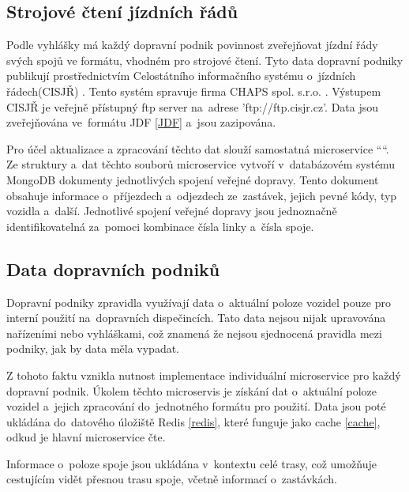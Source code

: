 \subsection [Jízdní řády]{Strojové čtení jízdních řádů} \label{strojoveCteniJR}
Podle vyhlášky \cite{vyhlaskaJizdniRady} má každý dopravní podnik povinnost zveřejňovat jízdní řády svých spojů ve formátu, vhodném pro strojové čtení. Tyto data dopravní podniky publikují prostřednictvím Celostátního informačního systému o~jízdních řádech(CISJŘ) \cite{cisjr}. Tento systém spravuje firma CHAPS spol. s.r.o. \cite{chaps}. Výstupem CISJŘ je veřejně přístupný ftp server na~adrese 'ftp://ftp.cisjr.cz'. Data jsou zveřejňována ve~formátu JDF \ref{JDF} a~jsou zazipována. \par
Pro účel aktualizace a zpracování těchto dat slouží samostatná microservice ““.
Ze struktury a~dat těchto souborů microservice vytvoří v~databázovém systému MongoDB dokumenty jednotlivých spojení veřejné dopravy. Tento dokument obsahuje informace o~příjezdech a~odjezdech ze~zastávek, jejich pevné kódy, typ vozidla a~další. Jednotlivé spojení veřejné dopravy jsou jednoznačně identifikovatelná za~pomoci kombinace čísla linky a~čísla spoje.
\subsection {Data dopravních podniků}
Dopravní podniky zpravidla využívají data o~aktuální poloze vozidel pouze pro interní použití na~dopravních dispečincích. Tato data nejsou nijak upravována nařízeními nebo vyhláškami, což znamená že nejsou sjednocená pravidla mezi podniky, jak by data měla vypadat.\par
Z tohoto faktu vznikla nutnost implementace individuální microservice pro každý dopravní podnik. Úkolem těchto microservis je získání dat o~aktuální poloze vozidel a~jejich zpracování do~jednotného formátu pro použití. Data jsou poté ukládána do~datového úložiště Redis \ref{redis}, které funguje jako cache \ref{cache}, odkud je hlavní microservice čte.\par
Informace o~poloze spoje jsou ukládána v~kontextu celé trasy, což umožňuje cestujícím vidět přesnou trasu spoje, včetně informací o~zastávkách.
